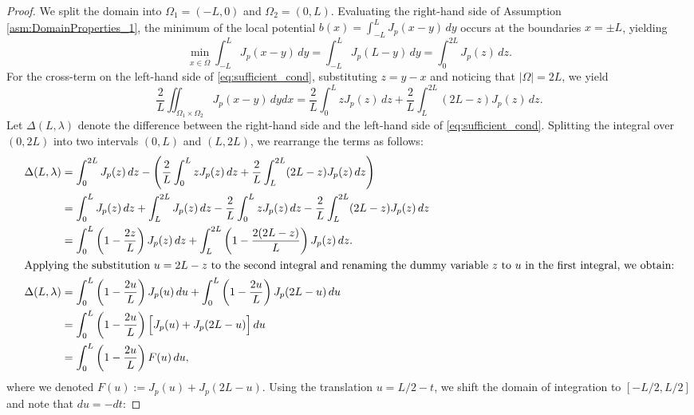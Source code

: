 \documentclass[11pt, a4paper]{article}
\theoremstyle{break}
\theoremstyle{break}
\theoremstyle{break}
\theoremstyle{break}
\theoremstyle{break}
\theoremstyle{break}
\theoremstyle{break}
\theoremstyle{break}
\theoremstyle{break}
\begin{document}
\begin{proof}
    We split the domain into $\Omega_1 = (-L, 0)$ and $\Omega_2 = (0, L)$. Evaluating the right-hand side of Assumption \ref{asm:DomainProperties_1}, the minimum of the local potential $b(x) = \int_{-L}^L J_p(x-y) \, dy$ occurs at the boundaries $x = \pm L$, yielding
    \begin{equation*}
        \min_{x \in \overline{\Omega}} \int_{-L}^L J_p(x-y) \, dy = \int_{-L}^L J_p(L-y) \, dy = \int_0^{2L} J_p(z) \, dz.
    \end{equation*}
    For the cross-term on the left-hand side of \eqref{eq:sufficient_cond}, substituting $z = y-x$ and noticing that $|\Omega| = 2L$, we yield
    \begin{equation*}
        \frac{2}{L} \iint_{\Omega_1 \times \Omega_2} J_p(x-y) \, dy dx = \frac{2}{L} \int_0^L z J_p(z) \, dz + \frac{2}{L} \int_L^{2L} (2L-z) J_p(z) \, dz.
    \end{equation*}
    Let $\Delta(L, \lambda)$ denote the difference between the right-hand side and the left-hand side of \eqref{eq:sufficient_cond}. Splitting the integral over $(0, 2L)$ into two intervals $(0, L)$ and $(L, 2L)$, we rearrange the terms as follows:
    \begin{align*}
        \Delta(L, \lambda) &= \int_0^{2L} J_p(z) \, dz - \left( \frac{2}{L} \int_0^L z J_p(z) \, dz + \frac{2}{L} \int_L^{2L} (2L-z) J_p(z) \, dz \right) \\
        &= \int_0^L J_p(z) \, dz + \int_L^{2L} J_p(z) \, dz - \frac{2}{L} \int_0^L z J_p(z) \, dz - \frac{2}{L} \int_L^{2L} (2L-z) J_p(z) \, dz \\
        &= \int_0^L \left( 1 - \frac{2z}{L} \right) J_p(z) \, dz + \int_L^{2L} \left( 1 - \frac{2(2L-z)}{L} \right) J_p(z) \, dz. \\
    \intertext{Applying the substitution $u = 2L - z$ to the second integral and renaming the dummy variable $z$ to $u$ in the first integral, we obtain:}
        \Delta(L, \lambda) &= \int_0^L \left( 1 - \frac{2u}{L} \right) J_p(u) \, du + \int_0^L \left( 1 - \frac{2u}{L} \right) J_p(2L-u) \, du \\
        &= \int_0^L \left( 1 - \frac{2u}{L} \right) \Big[ J_p(u) + J_p(2L-u) \Big] \, du \\
        &= \int_0^L \left( 1 - \frac{2u}{L} \right) F(u) \, du,
    \end{align*}
    where we denoted $F(u) := J_p(u) + J_p(2L-u)$. Using the translation $u = L/2 - t$, we shift the domain of integration to $[-L/2, L/2]$ and note that $du = -dt$:

\end{proof}
\end{document}
